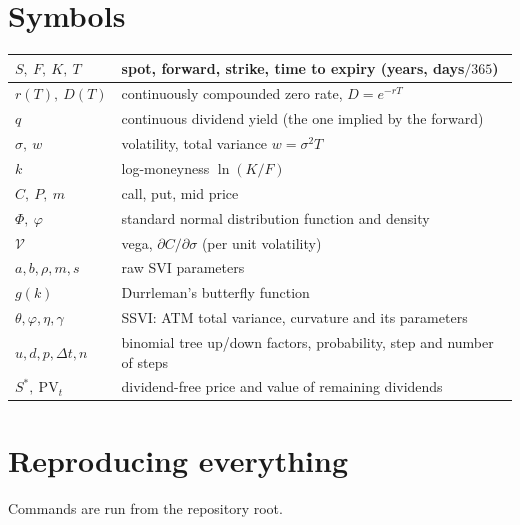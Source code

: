 \documentclass[11pt]{article}
\newcommand{\Norm}{\Phi}
\begin{document}
\appendix
\section{Symbols}

\begin{center}\small
\begin{tabular}{|l|L{11.5cm}|}
\hline
$S,\ F,\ K,\ T$ & spot, forward, strike, time to expiry (years, days$/365$) \\ \hline
$r(T),\ D(T)$ & continuously compounded zero rate, $D=e^{-rT}$ \\ \hline
$q$ & continuous dividend yield (the one implied by the forward) \\ \hline
$\sigma,\ w$ & volatility, total variance $w=\sigma^2T$ \\ \hline
$k$ & log-moneyness $\ln(K/F)$ \\ \hline
$C,\ P,\ m$ & call, put, mid price \\ \hline
$\Norm,\ \varphi$ & standard normal distribution function and density \\ \hline
$\mathcal V$ & vega, $\partial C/\partial\sigma$ (per unit volatility) \\ \hline
$a,b,\rho,m,s$ & raw SVI parameters \\ \hline
$g(k)$ & Durrleman's butterfly function \\ \hline
$\theta,\varphi,\eta,\gamma$ & SSVI: ATM total variance, curvature and its parameters \\ \hline
$u,d,p,\Delta t,n$ & binomial tree up/down factors, probability, step and number of steps \\ \hline
$S^*,\ \mathrm{PV}_t$ & dividend-free price and value of remaining dividends \\ \hline
\end{tabular}
\end{center}

\section{Reproducing everything}

Commands are run from the repository root.
\end{document}
